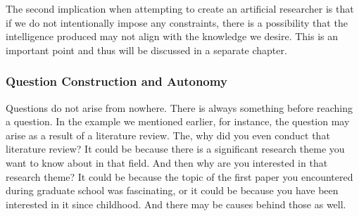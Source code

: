 \documentclass{book}
\begin{document}


The second implication when attempting to create an artificial researcher is that if we do not intentionally impose any constraints, there is a possibility that the intelligence produced may not align with the knowledge we desire. This is an important point and thus will be discussed in a separate chapter.

\subsubsection{Question Construction and Autonomy}

Questions do not arise from nowhere. There is always something before reaching a question. In the example we mentioned earlier, for instance, the question may arise as a result of a literature review. The, why did you even conduct that literature review? It could be because there is a significant research theme you want to know about in that field. And then why are you interested in that research theme? It could be because the topic of the first paper you encountered during graduate school was fascinating, or it could be because you have been interested in it since childhood. And there may be causes behind those as well.
\end{document}
